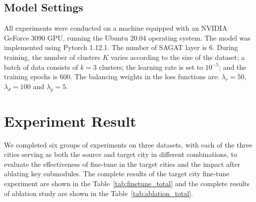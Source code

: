 \subsection{Model Settings}
All experiments were conducted on a machine equipped with an NVIDIA GeForce 3090 GPU, running the Ubuntu 20.04 operating system. The model was implemented using Pytorch 1.12.1. The number of SAGAT layer is $6$. During 
training, the number of clusters $K$ varies according to the size of the dataset; a batch of data consists of $k=3$ clusters; the learning rate is set to $10^{-5}$; and the training epochs is $600$. The balancing weights in the loss functions are: $\lambda_r = 50$, $\lambda_d = 100$ and $\lambda_g = 5$.

\section{Experiment Result}
\label{apdx:result}
We completed six groups of experiments on three datasets, with each of the three cities serving as both the source and target city in different combinations, to evaluate the effectiveness of fine-tune in the target cities and the impact after ablating key submodules. The complete results of the target city fine-tune experiment are shown in the Table~\ref{tab:finetune_total} and the complete results of ablation study are shown in the Table~\ref{tab:ablation_total}.
